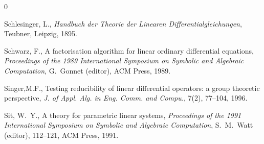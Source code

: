 \begin{thebibliography}{0}


Schlesinger, L., {\em Handbuch der Theorie der Linearen
Differentialgleichungen}, Teubner, Leipzig, 1895.



Schwarz, F., A factorisation algorithm for linear ordinary
differential equations, {\em Proceedings of the 1989 International
Symposium on Symbolic and Algebraic Computation},
 G.~Gonnet (editor),
ACM Press, 1989.



Singer,M.F., Testing reducibility of linear differential
operators: a group theoretic perspective, {\em J. of Appl. Alg. in
Eng. Comm. and Compu.}, 7(2), 77--104, 1996.






Sit, W.~Y., A theory for parametric linear systems,
 {\em Proceedings of the 1991 International Symposium on Symbolic and Algebraic
 Computation},  S.~M.~Watt (editor),
112--121, ACM Press, 1991.






\end{thebibliography}
